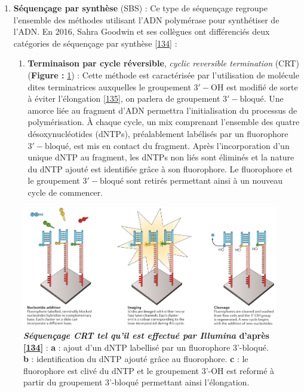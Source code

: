 \documentclass[12pt,a4paper,twoside]{ugathesis}
\providecommand{\tightlist}{%
  \setlength{\itemsep}{0pt}\setlength{\parskip}{0pt}}
\theoremstyle{definition}
\theoremstyle{definition}
\theoremstyle{definition}
\theoremstyle{remark}
\begin{document}
\begin{enumerate}
\def\labelenumi{\arabic{enumi}.}
\tightlist
\item
  \textbf{Séquençage par synthèse} (SBS) : Ce type de séquençage
  regroupe l'ensemble des méthodes utilisant l'ADN polymérase pour
  synthétiser de l'ADN. En 2016, Sahra Goodwin et ses collègues ont
  différenciés deux catégories de séquençage par synthèse
  {[}\protect\hyperlink{ref-Goodwin2016}{134}{]} :

  \begin{enumerate}
  \def\labelenumii{\alph{enumii}.}
  \tightlist
  \item
    \textbf{Terminaison par cycle réversible}, \emph{cyclic reversible
    termination} (CRT) (\textbf{Figure : }\ref{fig:pictcrtSeq}) : Cette
    méthode est caractérisée par l'utilisation de molécule dites
    terminatrices auxquelles le groupement \(\mathrm{3'-OH}\) est
    modifié de sorte à éviter l'élongation
    {[}\protect\hyperlink{ref-Guo2008}{135}{]}, on parlera de groupement
    \(\mathrm{3'-bloqué}\). Une amorce liée au fragment d'ADN permettra
    l'initialisation du processus de polymérisation. À chaque cycle, un
    mix comprenant l'ensemble des quatre désoxynucléotides (dNTPs),
    préalablement labélisés par un fluorophore \(\mathrm{3'-bloqué}\),
    est mis en contact du fragment. Après l'incorporation d'un unique
    dNTP au fragment, les dNTPs non liés sont éliminés et la nature du
    dNTP ajouté est identifiée grâce à son fluorophore. Le fluorophore
    et le groupement \(\mathrm{3'-bloqué}\) sont retirés permettant
    ainsi à un nouveau cycle de commencer.
  \end{enumerate}
\end{enumerate}

\begin{figure}

{\centering \includegraphics[scale=.24]{figure/CRT_seq_illumina} 

}

\caption[Séquençage CRT tel qu'il est effectué par Illumina]{\textbf{\emph{Séquençage CRT tel qu'il est effectué par
Illumina} d'après {[}\protect\hyperlink{ref-Goodwin2016}{134}{]}} :
\textbf{a} : ajout d'un dNTP labellisé par un fluorophore 3'-bloqué.
\textbf{b} : identification du dNTP ajouté grâce au fluorophore.
\textbf{c} : le fluorophore est clivé du dNTP et le groupement 3'-OH est
reformé à partir du groupement 3'-bloqué permettant ainsi l'élongation.}\label{fig:pictcrtSeq}
\end{figure}
\end{document}
